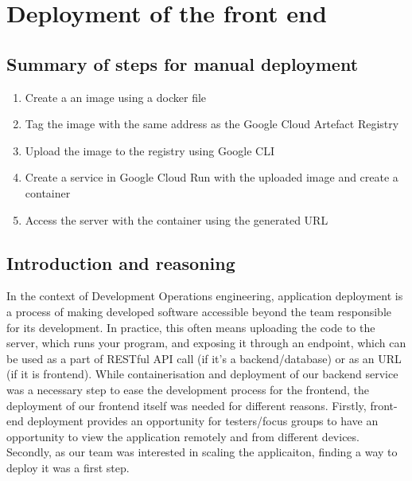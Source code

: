 \section{Deployment of the front end}

\subsection{Summary of steps for manual deployment}

\begin{enumerate} \itemsep0pt \parskip0pt
    \item Create a an image using a docker file
    \item Tag the image with the same address as the Google Cloud Artefact Registry 
    \item Upload the image to the registry using Google CLI
    \item Create a service in Google Cloud Run with the uploaded image and create a container
    \item Access the server with the container using the generated URL
\end{enumerate}

\subsection{Introduction and reasoning}
In the context of Development Operations engineering, application deployment is a process of making developed software accessible beyond the team responsible for its development. In practice, this often means uploading the code to the server, which runs your program, and exposing it through an endpoint, which can be used as a part of RESTful API call (if it's a backend/database) or as an URL (if it is frontend). While containerisation and deployment of our backend service was a necessary step to ease the development process for the frontend, the deployment of our frontend itself was needed for different reasons. Firstly, front-end deployment provides an opportunity for testers/focus groups to have an opportunity to view the application remotely and from different devices. Secondly, as our team was interested in scaling the applicaiton, finding a way to deploy it was a first step.

